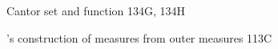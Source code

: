 \indexmedskip

Cantor set and function 134G, 134H




\indexheader{\Caratheodory}
\Caratheodory's construction of measures from outer measures 113C





































































































